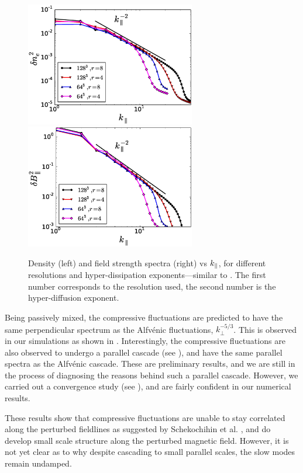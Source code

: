 \begin{figure}
\begin{center}
    \includegraphics[width=7.4cm]{figs/slowmodes/dneconv_kz.eps}
    \includegraphics[width=7.4cm]{figs/slowmodes/dbparconv_kz.eps}
    \caption{Density (left) and field strength spectra (right) vs $k_\parallel$, for different
    resolutions and hyper-dissipation exponents---similar to
    . The first number corresponds to the resolution used, the
    second number is the hyper-diffusion exponent.}
    \label{slowmodes:fig:dneconv}
\end{center}
\end{figure}
    
    Being passively mixed, the compressive fluctuations are
    predicted to have the same perpendicular spectrum as the Alfv\'{e}nic fluctuations,
    $k_\perp^{-5/3}$. This is
    observed in our simulations as shown in .
    Interestingly, the compressive fluctuations are also observed to undergo a parallel cascade (see
    ), and have the same parallel spectra as the
    Alfv\'{e}nic cascade. These are preliminary results, and we are still in the process
    of diagnosing the reasons behind such a parallel cascade. However, we carried out a convergence study (see
    ), and are fairly confident in our numerical results.
    
    These results show that compressive fluctuations are unable to stay correlated along
    the perturbed fieldlines as suggested by Schekochihin et al. \cite{tome}, and do
    develop small scale structure along the perturbed magnetic field. However, it is not yet clear as to why despite cascading to small parallel scales, the slow modes remain undamped. 

